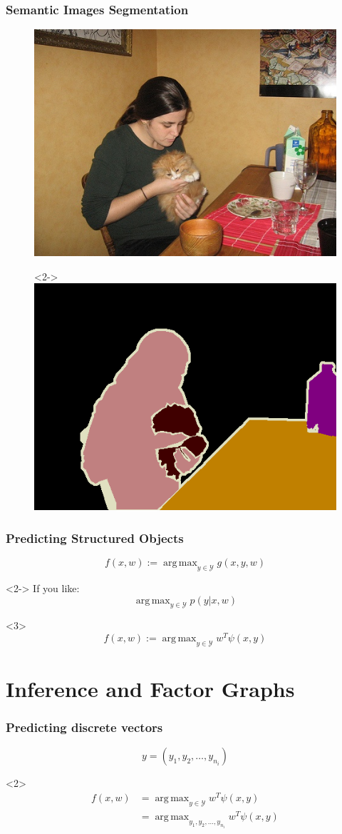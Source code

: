 \documentclass{beamer}
\DeclareMathOperator*{\argmax}{arg\,max}
\begin{document}
    \begin{frame}
        \frametitle{Semantic Images Segmentation}
        \begin{figure}
            \includegraphics[width=.45 \textwidth]{images/pascal}
            \begin{visibleenv}<2->
                \includegraphics[width=.45 \textwidth]{images/pascal_gt}
            \end{visibleenv}
        \end{figure}
    \end{frame}

    \begin{frame}
        \frametitle{Predicting Structured Objects}
        \[f(x, w) := \argmax_{y \in \mathcal{Y}}  g(x, y, w) \]
        \begin{visibleenv}<2->
        If you like:
        \[\argmax_{y \in \mathcal{Y}}  p(y|x, w) \]
        \end{visibleenv}
        
        \begin{visibleenv}<3>
        \[f(x, w) := \argmax_{y \in \mathcal{Y}}  w^T \psi(x, y) \]
        \end{visibleenv}
    \end{frame}

    \section{Inference and Factor Graphs}
    \begin{frame}
        \frametitle{Predicting discrete vectors}
        \[y = (y_1, y_2, \dotsc, y_{n_i})\]
        \begin{visibleenv}<2>
            \begin{align*}
            f(x, w) &= \argmax_{y \in \mathcal{Y}}  w^T \psi(x, y)\\
                &= \argmax_{y_1, y_2, \dotsc, y_{n_i}} w^T \psi(x, y)
            \end{align*}
        \end{visibleenv}
    \end{frame}
\end{document}
